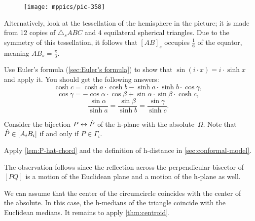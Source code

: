 {

\begin{wrapfigure}{r}{28mm}
\vskip-0mm
\centering
\texttt{[image: mppics/pic-358]}
\end{wrapfigure}

Alternatively, 
look at the tessellation of the hemisphere in the picture; 
it is made from 12 copies of $\triangle_s A B C$ and 4 equilateral spherical triangles.
Due to the symmetry of this tessellation, it follows that $[AB]_s$ occupies $\tfrac16$ of the equator, meaning $AB_s=\tfrac\pi3$.

}

Use Euler's formula (\ref{sec:Euler's formula}) to show that $\sin(i\cdot x)=i\cdot\sinh x$ and apply it.
You should get the following answers:
\[\cosh c=\cosh a \cdot \cosh b-\sinh a\cdot \sinh b\cdot \cos\gamma,\]
\[\cos \gamma=-\cos \alpha \cdot \cos \beta+\sin \alpha\cdot \sin \beta \cdot \cosh c,\]
\[\frac{\sin \alpha}{\sinh a}=\frac{\sin \beta}{\sinh b}=\frac{\sin \gamma}{\sinh c}.\]




\setcounter{eqtn}{0}



Consider the bijection $P\leftrightarrow \hat P$ of the h-plane with the absolute~$\Omega$.
Note that $\hat P\in [A_iB_i]$ if and only if $P\in\Gamma_i$.

 Apply \ref{lem:P-hat-chord} and the definition of h-distance in \ref{sec:conformal-model}.

The observation follows since the reflection across the perpendicular bisector of $[PQ]$ is a motion of the Euclidean plane and a motion of the h-plane as well.

We can assume that the center of the circumcircle coincides with the center of the absolute.
In this case, the h-medians of the triangle coincide with the Euclidean medians.
It remains to apply \ref{thm:centroid}.

